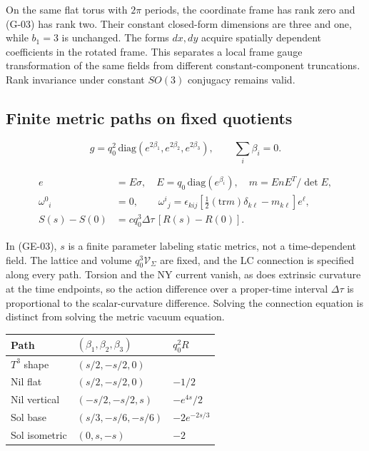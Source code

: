 On the same flat torus with $2\pi$ periods, the coordinate frame has rank zero and (G-03) has rank two. Their constant closed-form dimensions are three and one, while $b_1=3$ is unchanged. The forms $dx,dy$ acquire spatially dependent coefficients in the rotated frame. This separates a local frame gauge transformation of the same fields from different constant-component truncations. Rank invariance under constant $SO(3)$ conjugacy remains valid.

\subsection{Finite metric paths on fixed quotients}

\begin{equation}\tag{G-04}\label{eq:G-04}
g=q_0^2\,\mathrm{diag}(e^{2\beta_1},e^{2\beta_2},e^{2\beta_3}),\qquad \sum_i\beta_i=0.
\end{equation}

\begin{equation}\tag{GE-03}\label{eq:GE-03}
\begin{aligned}e&=E\sigma,\quad E=q_0\,\mathrm{diag}(e^{\beta_i}),\quad m=EnE^T/\det E,\\ \omega^0{}_i&=0,\qquad\omega^i{}_j=\epsilon_{kij}\left[\tfrac12(\mathrm{tr}m)\delta_{k\ell}-m_{k\ell}\right]e^\ell,\\ S(s)-S(0)&=c q_0^3\Delta\tau\,[R(s)-R(0)].\end{aligned}
\end{equation}

In (GE-03), $s$ is a finite parameter labeling static metrics, not a time-dependent field. The lattice and volume $q_0^3\mathcal V_\Sigma$ are fixed, and the LC connection is specified along every path. Torsion and the NY current vanish, as does extrinsic curvature at the time endpoints, so the action difference over a proper-time interval $\Delta\tau$ is proportional to the scalar-curvature difference. Solving the connection equation is distinct from solving the metric vacuum equation.

\begin{center}\small\begin{tabularx}{\textwidth}{@{}>{\raggedright\arraybackslash}X>{\raggedright\arraybackslash}X>{\raggedright\arraybackslash}X@{}}\toprule
Path & $(\beta_1,\beta_2,\beta_3)$ &  $q_0^2 R$\\\midrule
$T^3$ shape & $(s/2,-s/2,0)$ & 0\\
Nil flat & $(s/2,-s/2,0)$ & $-1/2$\\
Nil vertical & $(-s/2,-s/2,s)$ & $-e^{4s}/2$\\
Sol base & $(s/3,-s/6,-s/6)$ & $-2e^{-2s/3}$\\
Sol isometric & $(0,s,-s)$ & $-2$\\
\bottomrule\end{tabularx}\end{center}

